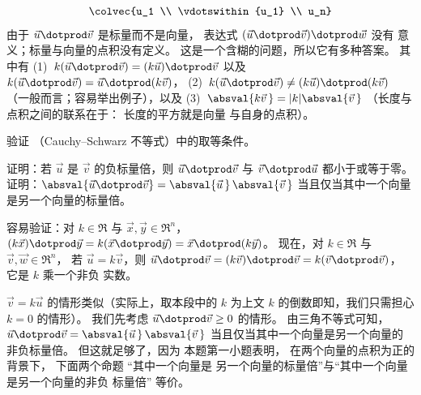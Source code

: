 \begin{exercises}
\begin{answer}
\begin{exparts}
\begin{equation*}
              \colvec{u_1 \\ \vdotswithin{u_1} \\ u_n}
          \end{equation*}
        \partsitem 由于 \( \vec{u}\dotprod\vec{v} \) 
          是标量而不是向量，
          表达式 \( (\vec{u}\dotprod\vec{v})\dotprod\vec{w} \) 没有
          意义；标量与向量的点积没有定义。
        \partsitem 这是一个含糊的问题，所以它有多种答案。
          其中有 
          (1)~\( k(\vec{u}\dotprod\vec{v})=(k\vec{u})\dotprod\vec{v} \)
          以及 \( k(\vec{u}\dotprod\vec{v})=\vec{u}\dotprod(k\vec{v}) \)，
          (2)~\( k(\vec{u}\dotprod\vec{v})\neq (k\vec{u})\dotprod(k\vec{v}) \)
          （一般而言；容易举出例子），以及
          (3)~\( \absval{k\vec{v}\,}=\lvert k\rvert\absval{\vec{v}\,} \) 
          （长度与点积之间的联系在于：
          长度的平方就是向量
          与自身的点积）。
      \end{exparts}   
    \end{answer}
  \item \label{exer:EqOfCauchySchwarz} 
    验证 
    （Cauchy–Schwarz 不等式）中的取等条件。
    \begin{exparts}
       \partsitem 证明：若 \( \vec{u} \) 是
         \( \vec{v} \) 的负标量倍，则 \( \vec{u}\dotprod\vec{v} \) 与
         \( \vec{v}\dotprod\vec{u} \) 都小于或等于零。
       \partsitem 证明：\( \absval{\vec{u}\dotprod\vec{v}}=
                            \absval{\vec{u}\,}\,\absval{\vec{v}\,} \)
         当且仅当其中一个向量是另一个向量的标量倍。
    \end{exparts}
    \begin{answer}
       \begin{exparts}
         \partsitem 容易验证：对 \( k\in\Re \) 与
           \( \vec{x},\vec{y}\in\Re^n \)，
           \( (k\vec{x})\dotprod\vec{y}=k(\vec{x}\dotprod\vec{y})
           =\vec{x}\dotprod(k\vec{y}) \)。
           现在，对 \( k\in\Re \) 与 \( \vec{v},\vec{w}\in\Re^n \)，
           若 \( \vec{u}=k\vec{v} \)，则
           \( \vec{u}\dotprod\vec{v}=(k\vec{v})\dotprod\vec{v}
             =k(\vec{v}\dotprod\vec{v}) \)，
           它是 \( k \) 乘一个非负
           实数。

           \( \vec{v}=k\vec{u} \) 的情形类似（实际上，取本段中的
           \( k \) 为上文 \( k \) 的倒数即知，我们只需担心
           \( k=0 \) 的情形）。
         \partsitem 我们先考虑 $\vec{u}\dotprod\vec{v}\geq 0$ 的情形。
           由三角不等式可知，
           \( \vec{u}\dotprod\vec{v}=\absval{\vec{u}\,}\,\absval{\vec{v}\,} \)
           当且仅当其中一个向量是另一个向量的非负标量倍。
           但这就足够了，因为 
           本题第一小题表明，
           在两个向量的点积为正的背景下，
           下面两个命题 
           “其中一个向量是
           另一个向量的标量倍”与“其中一个向量是另一个向量的非负
           标量倍”
           等价。


\end{exparts}
\end{answer}
\end{exercises}
